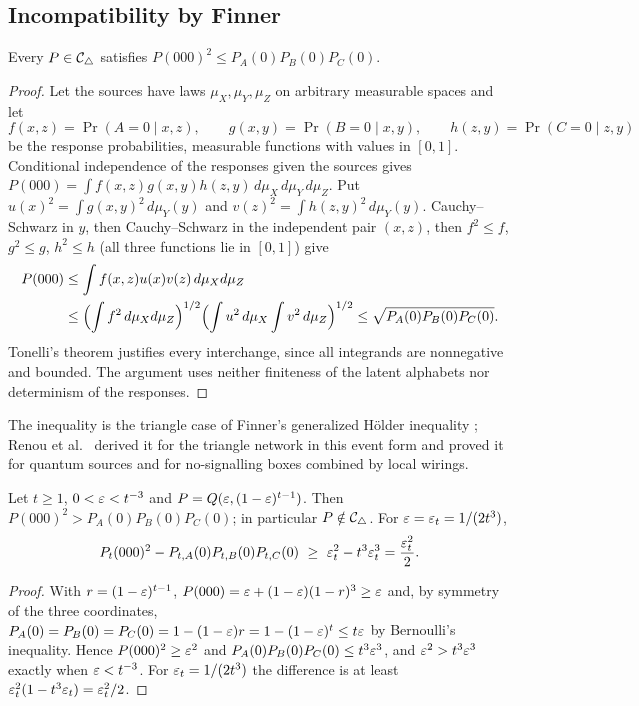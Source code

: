 \subsection{Incompatibility by Finner}\label{sec:incompat}

\begin{lemma}\label{lem:finner}
Every $P\in\mathcal C_{\triangle}$ satisfies $P(000)^2\le P_A(0)P_B(0)P_C(0)$.
\end{lemma}
\begin{proof}
Let the sources have laws $\mu_X,\mu_Y,\mu_Z$ on arbitrary measurable spaces and let
\[
f(x,z)=\Pr(A=0\mid x,z),\qquad g(x,y)=\Pr(B=0\mid x,y),\qquad h(z,y)=\Pr(C=0\mid z,y)
\]
be the response probabilities, measurable functions with values in $[0,1]$. Conditional independence of the responses given the sources gives $P(000)=\int f(x,z)g(x,y)h(z,y)\,d\mu_X\,d\mu_Y\,d\mu_Z$. Put $u(x)^2=\int g(x,y)^2\,d\mu_Y(y)$ and $v(z)^2=\int h(z,y)^2\,d\mu_Y(y)$. Cauchy--Schwarz in $y$, then Cauchy--Schwarz in the independent pair $(x,z)$, then $f^2\le f$, $g^2\le g$, $h^2\le h$ (all three functions lie in $[0,1]$) give
\[
\begin{aligned}
P(000)&\le\int f(x,z)u(x)v(z)\,d\mu_Xd\mu_Z\\
&\le\Bigl(\int f^2\,d\mu_Xd\mu_Z\Bigr)^{1/2}\Bigl(\int u^2\,d\mu_X\int v^2\,d\mu_Z\Bigr)^{1/2}
\le\sqrt{P_A(0)P_B(0)P_C(0)}.
\end{aligned}
\]
Tonelli's theorem justifies every interchange, since all integrands are nonnegative and bounded. The argument uses neither finiteness of the latent alphabets nor determinism of the responses.
\end{proof}

The inequality is the triangle case of Finner's generalized Hölder inequality \cite{Finner1992}; Renou et al.\ \cite{Renou2019} derived it for the triangle network in this event form and proved it for quantum sources and for no-signalling boxes combined by local wirings.

\begin{lemma}\label{lem:violation}
Let $t\ge1$, $0<\varepsilon<t^{-3}$ and $P=Q(\varepsilon,(1-\varepsilon)^{t-1})$. Then $P(000)^2>P_A(0)P_B(0)P_C(0)$; in particular $P\notin\mathcal C_{\triangle}$. For $\varepsilon=\varepsilon_t=1/(2t^3)$,
\[
P_t(000)^2-P_{t,A}(0)P_{t,B}(0)P_{t,C}(0)\ \ge\ \eps_t^2-t^3\eps_t^3=\frac{\eps_t^2}{2}.
\]
\end{lemma}
\begin{proof}
With $r=(1-\varepsilon)^{t-1}$, $P(000)=\varepsilon+(1-\varepsilon)(1-r)^3\ge\varepsilon$ and, by symmetry of the three coordinates, $P_A(0)=P_B(0)=P_C(0)=1-(1-\varepsilon)r=1-(1-\varepsilon)^t\le t\varepsilon$ by Bernoulli's inequality. Hence $P(000)^2\ge\varepsilon^2$ and $P_A(0)P_B(0)P_C(0)\le t^3\varepsilon^3$, and $\varepsilon^2>t^3\varepsilon^3$ exactly when $\varepsilon<t^{-3}$. For $\varepsilon_t=1/(2t^3)$ the difference is at least $\varepsilon_t^2(1-t^3\varepsilon_t)=\varepsilon_t^2/2$.
\end{proof}

